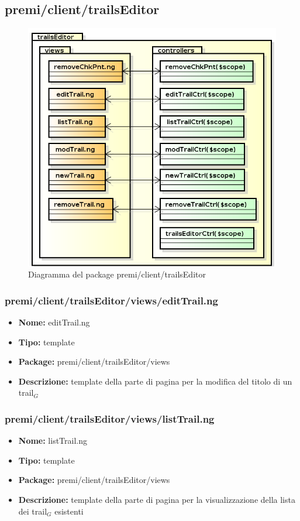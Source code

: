 \subsection{premi/client/trailsEditor}
\begin{figure}[!h]
\begin{center}
\includegraphics[scale=0.45]{img/diapkg/trailsEditor.png}
\caption{Diagramma del package premi/client/trailsEditor}
\end{center}
\end{figure}
\subsubsection{premi/client/trailsEditor/views/editTrail.ng}
\begin{itemize}
  \item[] \textbf{Nome:} editTrail.ng
  \item[] \textbf{Tipo:} template
  \item[] \textbf{Package:} premi/client/trailsEditor/views
  \item[] \textbf{Descrizione:}  template della parte di pagina per la modifica del titolo di un trail$_G$
\end{itemize}
\subsubsection{premi/client/trailsEditor/views/listTrail.ng}
\begin{itemize}
  \item[] \textbf{Nome:} listTrail.ng
  \item[] \textbf{Tipo:} template
  \item[] \textbf{Package:} premi/client/trailsEditor/views
  \item[] \textbf{Descrizione:}  template della parte di pagina per la visualizzazione della lista dei trail$_G$ esistenti
\end{itemize}
